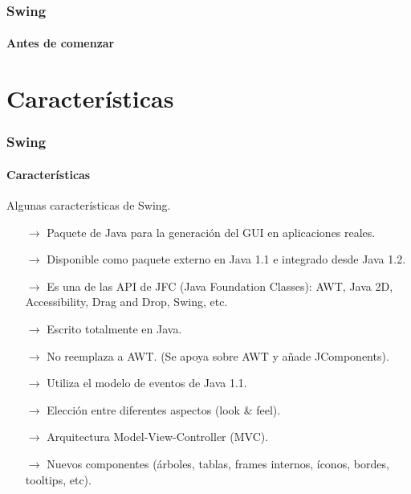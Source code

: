 \documentclass{beamer}
\begin{document}
    \begin{frame}
		\frametitle{Swing}
		\framesubtitle{Antes de comenzar}
		\begin{center}
		\end{center}
	\end{frame}

    \section{Caracter\'isticas}
    
	\begin{frame}
		\frametitle{Swing}
		\framesubtitle{Caracter\'isticas}
		
		Algunas caracter\'isticas de Swing. 
		{\scriptsize
		\begin{itemize}
		    \item[$\rightarrow$] Paquete de Java para la generaci\'on del GUI en aplicaciones reales. 
		    \item[$\rightarrow$] Disponible como paquete externo en Java 1.1 e integrado desde Java 1.2.
		    \item[$\rightarrow$] Es una de las API de JFC (Java Foundation Classes): AWT, Java 2D, Accessibility, Drag and Drop, Swing, etc.
		    \item[$\rightarrow$] Escrito totalmente en Java. 
		    \item[$\rightarrow$] No reemplaza a AWT. (Se apoya sobre AWT y a\~nade JComponents).
		    \item[$\rightarrow$] Utiliza el modelo de eventos de Java 1.1.
		    \item[$\rightarrow$] Elecci\'on entre diferentes aspectos (look \& feel).
		    \item[$\rightarrow$] Arquitectura Model-View-Controller (MVC).
		    \item[$\rightarrow$] Nuevos componentes (\'arboles, tablas, frames internos, \'iconos, bordes, tooltips, etc).
		\end{itemize}}
	\end{frame}    
    
\end{document}

